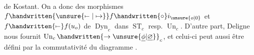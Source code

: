 de Kostant. On a donc des morphismes $f\handwritten{\unsure{\mathrel{\mapstochar\relbar}|\mapsto}}f\handwritten{\circ}i_{\unsure{o|0}}$ et $f\handwritten{\mathrel{\mapstochar\relbar}}f(u_o)$ de $\operatorname{Dyn}_c$ dans $\operatorname{ST}_c$ resp. $\operatorname{Un}_c$. D'autre part, Deligne nous fournit $\operatorname{Un}_c\handwritten{\to\unsure{\underline{\phi}|\underline{\varnothing}}}_c$, et celui-ci peut aussi être défini par la commutativité du diagramme 
.

